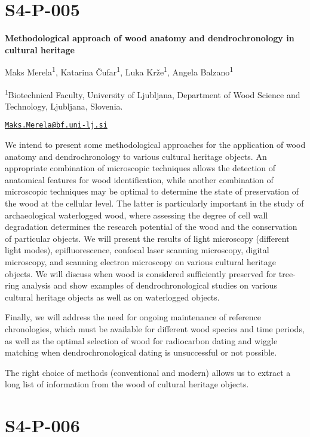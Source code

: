 \documentclass[
]{book}
\begin{document}
\hypertarget{s4-p-005}{%
\section*{S4-P-005}\label{s4-p-005}}

\textbf{Methodological approach of wood anatomy and dendrochronology in cultural heritage}

Maks Merela\textsuperscript{1}, Katarina Čufar\textsuperscript{1}, Luka Krže\textsuperscript{1}, Angela Balzano\textsuperscript{1}

\textsuperscript{1}Biotechnical Faculty, University of Ljubljana, Department of Wood Science and Technology, Ljubljana, Slovenia.

\href{mailto:Maks.Merela@bf.uni-lj.si}{\nolinkurl{Maks.Merela@bf.uni-lj.si}}

We intend to present some methodological approaches for the application of wood anatomy and dendrochronology to various cultural heritage objects. An appropriate combination of microscopic techniques allows the detection of anatomical features for wood identification, while another combination of microscopic techniques may be optimal to determine the state of preservation of the wood at the cellular level. The latter is particularly important in the study of archaeological waterlogged wood, where assessing the degree of cell wall degradation determines the research potential of the wood and the conservation of particular objects. We will present the results of light microscopy (different light modes), epifluorescence, confocal laser scanning microscopy, digital microscopy, and scanning electron microscopy on various cultural heritage objects. We will discuss when wood is considered sufficiently preserved for tree-ring analysis and show examples of dendrochronological studies on various cultural heritage objects as well as on waterlogged objects.

Finally, we will address the need for ongoing maintenance of reference chronologies, which must be available for different wood species and time periods, as well as the optimal selection of wood for radiocarbon dating and wiggle matching when dendrochronological dating is unsuccessful or not possible.

The right choice of methods (conventional and modern) allows us to extract a long list of information from the wood of cultural heritage objects.

\hypertarget{s4-p-006}{%
\section*{S4-P-006}\label{s4-p-006}}
\end{document}
